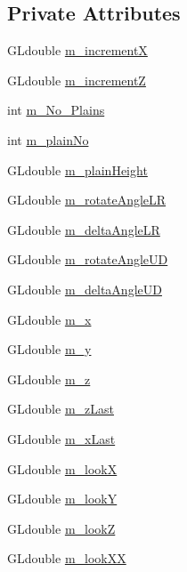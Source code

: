 \subsection*{Private Attributes}
\begin{DoxyCompactItemize}
\item 
G\+Ldouble \hyperlink{class_camera_ac25bd676d0c76ec08ab47c2c12d553e6}{m\+\_\+incrementX}
\item 
G\+Ldouble \hyperlink{class_camera_a777eebd5eecb1611eee536cfa5f31352}{m\+\_\+incrementZ}
\item 
int \hyperlink{class_camera_a0f0d872791aed39f2ac08f402f647915}{m\+\_\+\+No\+\_\+\+Plains}
\item 
int \hyperlink{class_camera_ac5693b74a6d1e8dfd24e0166166b5945}{m\+\_\+plain\+No}
\item 
G\+Ldouble \hyperlink{class_camera_ac7817dd04945678fc56b9384d85aeb5a}{m\+\_\+plain\+Height}
\item 
G\+Ldouble \hyperlink{class_camera_a2cec5d8ebb2cf924f341f2c8380dd3b0}{m\+\_\+rotate\+Angle\+LR}
\item 
G\+Ldouble \hyperlink{class_camera_aaee679a1afd9606b73b3aced250b6cc8}{m\+\_\+delta\+Angle\+LR}
\item 
G\+Ldouble \hyperlink{class_camera_a732416affaf942ce888b09c4ebf21d1c}{m\+\_\+rotate\+Angle\+UD}
\item 
G\+Ldouble \hyperlink{class_camera_aa7b595dcc6baf3ad640fddf4c5324255}{m\+\_\+delta\+Angle\+UD}
\item 
G\+Ldouble \hyperlink{class_camera_a25bb32ac42de7c4dd7363346e67f5109}{m\+\_\+x}
\item 
G\+Ldouble \hyperlink{class_camera_a453ac6c0c996ba47cc1783d45566a893}{m\+\_\+y}
\item 
G\+Ldouble \hyperlink{class_camera_a34fa5e648d04f0648e397ea7bde2d717}{m\+\_\+z}
\item 
G\+Ldouble \hyperlink{class_camera_ae08110e1bfe81d6f019924c0e67f3373}{m\+\_\+z\+Last}
\item 
G\+Ldouble \hyperlink{class_camera_ae5fb587e1a44ba40f7978e4425480192}{m\+\_\+x\+Last}
\item 
G\+Ldouble \hyperlink{class_camera_ab7ffaf41adca8d8d233cc7317ffff47b}{m\+\_\+lookX}
\item 
G\+Ldouble \hyperlink{class_camera_a319433486f0d49d9a0689d92ff7a9c71}{m\+\_\+lookY}
\item 
G\+Ldouble \hyperlink{class_camera_a8c78671164cc57c2e543e72dbd45f0e5}{m\+\_\+lookZ}
\item 
G\+Ldouble \hyperlink{class_camera_a911721fe8284d96a8b39f2643697f9b8}{m\+\_\+look\+XX}

\end{DoxyCompactItemize}
